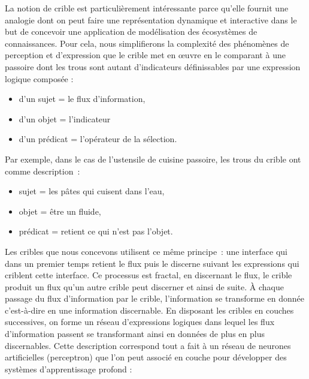 \documentclass[
  a4paper,
  DIV=11,
  numbers=noendperiod]{scrreprt}
\begin{document}
La notion de crible est particulièrement intéressante parce qu'elle
fournit une analogie dont on peut faire une représentation dynamique et
interactive dans le but de concevoir une application de modélisation des
écosystèmes de connaissances. Pour cela, nous simplifierons la
complexité des phénomènes de perception et d'expression que le crible
met en œuvre en le comparant à une passoire dont les trous sont autant
d'indicateurs définissables par une expression logique composée :

\begin{itemize}
\item
  d'un sujet = le flux d'information,
\item
  d'un objet = l'indicateur
\item
  d'un prédicat = l'opérateur de la sélection.
\end{itemize}

Par exemple, dans le cas de l'ustensile de cuisine passoire, les trous
du crible ont comme description~:

\begin{itemize}
\item
  sujet = les pâtes qui cuisent dans l'eau,
\item
  objet = être un fluide,
\item
  prédicat = retient ce qui n'est pas l'objet.
\end{itemize}

Les cribles que nous concevons utilisent ce même principe~: une
interface qui dans un premier temps retient le flux puis le discerne
suivant les expressions qui criblent cette interface. Ce processus est
fractal, en discernant le flux, le crible produit un flux qu'un autre
crible peut discerner et ainsi de suite. À chaque passage du flux
d'information par le crible, l'information se transforme en donnée
c'est-à-dire en une information discernable. En disposant les cribles en
couches successives, on forme un réseau d'expressions logiques dans
lequel les flux d'information passent se transformant ainsi en données
de plus en plus discernables. Cette description correspond tout a fait à
un réseau de neurones artificielles (perceptron) que l'on peut associé
en couche pour développer des systèmes d'apprentissage profond :
\end{document}
